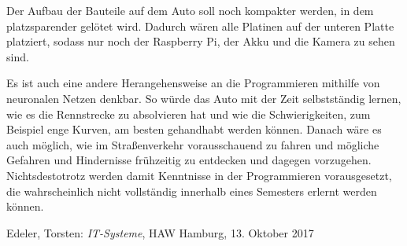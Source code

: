 \documentclass[a4paper, 12pt]{scrartcl}
\begin{document}
Der Aufbau der Bauteile auf dem Auto soll noch kompakter werden, in dem platzsparender gelötet wird. Dadurch wären alle Platinen auf der unteren Platte platziert, sodass nur noch der Raspberry Pi, der Akku und die Kamera zu sehen sind.

Es ist auch eine andere Herangehensweise an die Programmieren mithilfe von neuronalen Netzen denkbar. So würde das Auto mit der Zeit selbstständig lernen, wie es die Rennstrecke zu absolvieren hat und wie die Schwierigkeiten, zum Beispiel enge Kurven, am besten gehandhabt werden können. Danach wäre es auch möglich, wie im Straßenverkehr vorausschauend zu fahren und mögliche Gefahren und Hindernisse frühzeitig zu entdecken und dagegen vorzugehen. Nichtsdestotrotz werden damit Kenntnisse in der Programmieren vorausgesetzt, die wahrscheinlich nicht vollständig innerhalb eines Semesters erlernt werden können.

\newpage

\listoftables
{} 

\listoffigures
{} 


\begin{thebibliography}{}
	\bibitem{}
	Edeler, Torsten: \textit{IT-Systeme}, HAW Hamburg, 13. Oktober 2017
\end{thebibliography}
\end{document}
